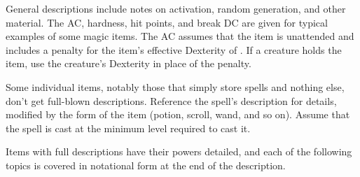 General descriptions include notes on activation, random generation, and other material. The AC, hardness, hit points, and break DC are given for typical examples of some magic items. The AC assumes that the item is unattended and includes a  penalty for the item's effective Dexterity of . If a creature holds the item, use the creature's Dexterity in place of the  penalty.

Some individual items, notably those that simply store spells and nothing else, don't get full-blown descriptions. Reference the spell's description for details, modified by the form of the item (potion, scroll, wand, and so on). Assume that the spell is cast at the minimum level required to cast it.

Items with full descriptions have their powers detailed, and each of the following topics is covered in notational form at the end of the description.

